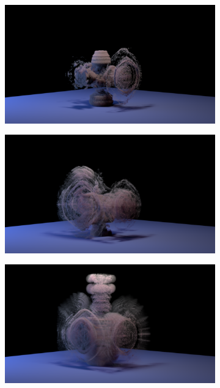 \documentclass[11pt]{article}
\begin{document}
\begin{figure}
\begin{subfigure}[h]{0.5\textwidth}
	\end{subfigure}
	\begin{subfigure}[h]{0.5\textwidth}
		\centering
		\includegraphics[width=\textwidth]{Figures/modes/plume0003.png}
	\end{subfigure}
	\begin{subfigure}[h]{0.5\textwidth}
		\centering
		\includegraphics[width=\textwidth]{Figures/modes/plume0004.png}	
	\end{subfigure}
	\begin{subfigure}[h]{0.5\textwidth}
		\centering
		\includegraphics[width=\textwidth]{Figures/modes/plume0005.png}

\end{subfigure}
\end{figure}
\end{document}
